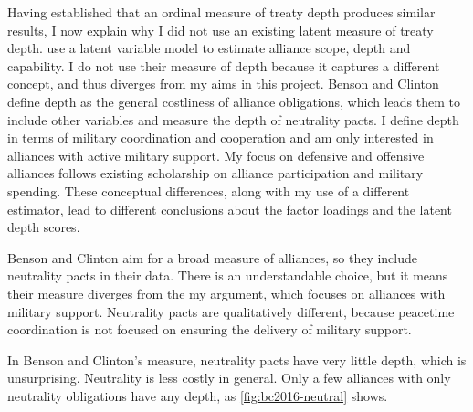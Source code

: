 \documentclass[12pt]{article}
\begin{document}
Having established that an ordinal measure of treaty depth produces similar results, I now explain why I did not use an existing latent measure of treaty depth. 
\citet{BensonClinton2016} use a latent variable model to estimate alliance scope, depth and capability. 
I do not use their measure of depth because it captures a different concept, and thus diverges from my aims in this project. 
Benson and Clinton define depth as the general costliness of alliance obligations, which leads them to include other variables and measure the depth of neutrality pacts. 
I define depth in terms of military coordination and cooperation and am only interested in alliances with active military support. 
My focus on defensive and offensive alliances follows existing scholarship on alliance participation and military spending.
These conceptual differences, along with my use of a different estimator, lead to different conclusions about the factor loadings and the latent depth scores.


Benson and Clinton aim for a broad measure of alliances, so they include neutrality pacts in their data. 
There is an understandable choice, but it means their measure diverges from the my argument, which focuses on alliances with military support. 
Neutrality pacts are qualitatively different, because peacetime coordination is not focused on ensuring the delivery of military support. 


In Benson and Clinton's measure, neutrality pacts have very little depth, which is unsurprising.
Neutrality is less costly in general.  
Only a few alliances with only neutrality obligations have any depth, as \autoref{fig:bc2016-neutral} shows.  
\end{document}
